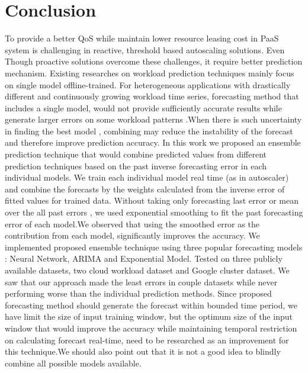 \section{Conclusion}

To provide a better QoS while maintain lower resource leasing cost in PaaS system is challenging in reactive, threshold based autoscaling solutions. Even Though  proactive solutions overcome these challenges, it require better prediction mechanism. Existing researches on  workload prediction techniques mainly focus on single model offline-trained. For heterogeneous  applications with drastically different  and continuously growing workload time series, forecasting method that includes a single model, would not provide sufficiently accurate results while generate larger errors on some workload patterns .When there is such uncertainty in finding the best model , combining may reduce the instability of the forecast and therefore improve prediction accuracy. In this work we proposed an ensemble prediction technique that would combine predicted values from different prediction techniques based on the past inverse forecasting error in each individual models. We train each individual model real time (as in autoscaler) and combine the forecasts by the weights calculated from the inverse error of fitted values for trained data. Without taking only forecasting last error or mean over the all past errors , we used exponential smoothing to fit the past forecasting error of each model.We observed that using the smoothed error as the contribution from each model, significantly improves the accuracy.  We implemented proposed ensemble technique using three popular forecasting models : Neural Network, ARIMA and Exponential Model. Tested on three publicly available datasets, two cloud workload dataset and Google cluster dataset.  We saw that our approach made the least errors in couple datasets while never performing worse than the individual prediction methods. Since proposed forecasting method should generate the forecast within bounded time period, we have limit the size of input training window, but the optimum size of the input window that would improve the accuracy while maintaining temporal restriction on calculating forecast real-time,  need to be researched as an improvement for this technique.We should also point out that it is not a good idea to blindly combine all possible models available.

